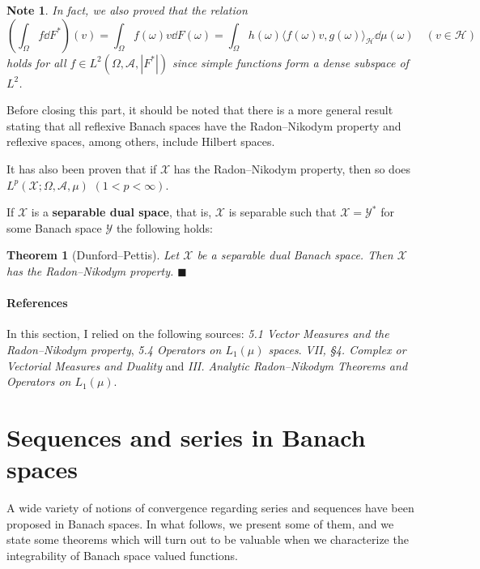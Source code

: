 \documentclass[a4paper, 12pt]{article}
\newtheorem{theo}[lem]{Theorem}
\newtheorem{note}[lem]{Note}
\newcommand*{\qedb}{\hfill\ensuremath{\blacksquare}}
\begin{document}
\begin{note}\normalfont In fact, we also proved that the relation
$$\left(\int_{\Omega} f \dd{F^*}\right)(v) = \int_{\Omega} f(\omega)v \dd{F(\omega)} = \int_{\Omega} h(\omega)\langle f(\omega)v, g(\omega) \rangle_{\mathcal{H}} \dd{\mu(\omega)} \quad (v \in \mathcal{H}) $$
holds for all $f \in L^2(\Omega, \mathcal{A}, |F^*|)$ since simple functions form a dense subspace of $L^2$.
\end{note}

Before closing this part, it should be noted that there is a more general result stating that all reflexive Banach spaces have the Radon\---Nikodym property and reflexive spaces, among others, include Hilbert spaces.

It has also been proven that if $\mathcal{X}$ has the Radon\---Nikodym property, then so does $L^p(\mathcal{X}; \Omega, \mathcal{A}, \mu)$ $(1 < p < \infty)$. 

If $\mathcal{X}$ is a \textbf{separable dual space}, that is, $\mathcal{X}$ is separable such that $\mathcal{X}= \mathcal{Y}^*$ for some Banach space $\mathcal{Y}$ the following holds:

\begin{theo}[Dunford\---Pettis] Let $\mathcal{X}$ be a separable dual Banach space. Then $\mathcal{X}$ has the Radon\---Nikodym property. \qedb
\end{theo}


\paragraph*{References} In this section, I relied on the following sources: \cite{ryan} \textit{5.1 Vector Measures and the Radon\---Nikodym property}, \textit{5.4 Operators on $L_1(\mu)$ spaces}. \cite{lang} \textit{VII, §4. Complex or Vectorial Measures and Duality} and \cite{diestel-uhl} \textit{III. Analytic Radon\---Nikodym Theorems and Operators on $L_1(\mu)$}.

\newpage
\appendix

\section{Sequences and series in Banach spaces}\label{sec:sequences-and-series}

A wide variety of notions of convergence regarding series and sequences have been proposed in Banach spaces. In what follows, we present some of them, and we state some theorems which will turn out to be valuable when we characterize the integrability of Banach space valued functions.
\end{document}
